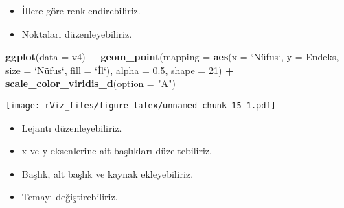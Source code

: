 \documentclass[
]{book}
\newenvironment{Shaded}{\begin{snugshade}}{\end{snugshade}}
\newcommand{\DataTypeTok}[1]{\textcolor[rgb]{0.13,0.29,0.53}{#1}}
\newcommand{\DecValTok}[1]{\textcolor[rgb]{0.00,0.00,0.81}{#1}}
\newcommand{\FloatTok}[1]{\textcolor[rgb]{0.00,0.00,0.81}{#1}}
\newcommand{\KeywordTok}[1]{\textcolor[rgb]{0.13,0.29,0.53}{\textbf{#1}}}
\newcommand{\NormalTok}[1]{#1}
\newcommand{\OperatorTok}[1]{\textcolor[rgb]{0.81,0.36,0.00}{\textbf{#1}}}
\newcommand{\StringTok}[1]{\textcolor[rgb]{0.31,0.60,0.02}{#1}}
\begin{document}
\begin{itemize}
\item
  İllere göre renklendirebiliriz.
\item
  Noktaları düzenleyebiliriz.
\end{itemize}

\begin{Shaded}
\begin{Highlighting}[]
\KeywordTok{ggplot}\NormalTok{(}\DataTypeTok{data =}\NormalTok{ v4) }\OperatorTok{+}
\StringTok{  }\KeywordTok{geom_point}\NormalTok{(}\DataTypeTok{mapping =} \KeywordTok{aes}\NormalTok{(}\DataTypeTok{x =} \StringTok{`}\DataTypeTok{Nüfus`, y = Endeks, size = }\StringTok{`}\NormalTok{Nüfus`, }\DataTypeTok{fill =} \StringTok{`}\DataTypeTok{İl}\StringTok{`}\NormalTok{), }\DataTypeTok{alpha =} \FloatTok{0.5}\NormalTok{, }\DataTypeTok{shape =} \DecValTok{21}\NormalTok{) }\OperatorTok{+}
\StringTok{  }\KeywordTok{scale_color_viridis_d}\NormalTok{(}\DataTypeTok{option =} \StringTok{"A"}\NormalTok{)}
\end{Highlighting}
\end{Shaded}

\texttt{[image: rViz\_files/figure-latex/unnamed-chunk-15-1.pdf]}

\begin{itemize}
\item
  Lejantı düzenleyebiliriz.
\item
  x ve y eksenlerine ait başlıkları düzeltebiliriz.
\item
  Başlık, alt başlık ve kaynak ekleyebiliriz.
\item
  Temayı değiştirebiliriz.
\end{itemize}
\end{document}
